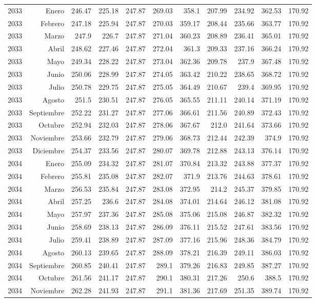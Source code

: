 \documentclass{article}%
\begin{document}
\begin{longtable}{|l r|r|r|r|r|r|r|r|r|r|}
2033&Enero&246.47&225.18&247.87&269.03&358.1&207.99&234.92&362.53&170.92\\%
2033&Febrero&247.18&225.94&247.87&270.03&359.17&208.44&235.66&363.77&170.92\\%
2033&Marzo&247.9&226.7&247.87&271.04&360.23&208.89&236.41&365.01&170.92\\%
2033&Abril&248.62&227.46&247.87&272.04&361.3&209.33&237.16&366.24&170.92\\%
2033&Mayo&249.34&228.22&247.87&273.04&362.36&209.78&237.9&367.48&170.92\\%
2033&Junio&250.06&228.99&247.87&274.05&363.42&210.22&238.65&368.72&170.92\\%
2033&Julio&250.78&229.75&247.87&275.05&364.49&210.67&239.4&369.95&170.92\\%
2033&Agosto&251.5&230.51&247.87&276.05&365.55&211.11&240.14&371.19&170.92\\%
2033&Septiembre&252.22&231.27&247.87&277.06&366.61&211.56&240.89&372.43&170.92\\%
2033&Octubre&252.94&232.03&247.87&278.06&367.67&212.0&241.64&373.66&170.92\\%
2033&Noviembre&253.66&232.79&247.87&279.06&368.73&212.44&242.39&374.9&170.92\\%
2033&Diciembre&254.37&233.56&247.87&280.07&369.78&212.88&243.13&376.14&170.92\\%
2034&Enero&255.09&234.32&247.87&281.07&370.84&213.32&243.88&377.37&170.92\\%
2034&Febrero&255.81&235.08&247.87&282.07&371.9&213.76&244.63&378.61&170.92\\%
2034&Marzo&256.53&235.84&247.87&283.08&372.95&214.2&245.37&379.85&170.92\\%
2034&Abril&257.25&236.6&247.87&284.08&374.01&214.64&246.12&381.08&170.92\\%
2034&Mayo&257.97&237.36&247.87&285.08&375.06&215.08&246.87&382.32&170.92\\%
2034&Junio&258.69&238.13&247.87&286.09&376.11&215.52&247.61&383.56&170.92\\%
2034&Julio&259.41&238.89&247.87&287.09&377.16&215.96&248.36&384.79&170.92\\%
2034&Agosto&260.13&239.65&247.87&288.09&378.21&216.39&249.11&386.03&170.92\\%
2034&Septiembre&260.85&240.41&247.87&289.1&379.26&216.83&249.85&387.27&170.92\\%
2034&Octubre&261.56&241.17&247.87&290.1&380.31&217.26&250.6&388.5&170.92\\%
2034&Noviembre&262.28&241.93&247.87&291.1&381.36&217.69&251.35&389.74&170.92\\%

\end{longtable}
\end{document}
